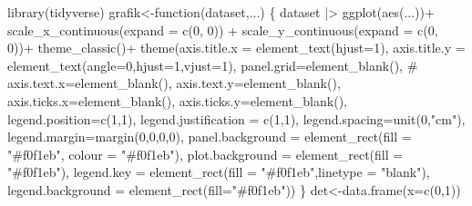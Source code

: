\documentclass[
  letterpaper,
  DIV=11,
  numbers=noendperiod]{scrartcl}
\newenvironment{Shaded}{\begin{snugshade}}{\end{snugshade}}
\newcommand{\AttributeTok}[1]{\textcolor[rgb]{0.40,0.45,0.13}{#1}}
\newcommand{\CommentTok}[1]{\textcolor[rgb]{0.37,0.37,0.37}{#1}}
\newcommand{\ControlFlowTok}[1]{\textcolor[rgb]{0.00,0.23,0.31}{#1}}
\newcommand{\DecValTok}[1]{\textcolor[rgb]{0.68,0.00,0.00}{#1}}
\newcommand{\FunctionTok}[1]{\textcolor[rgb]{0.28,0.35,0.67}{#1}}
\newcommand{\NormalTok}[1]{\textcolor[rgb]{0.00,0.23,0.31}{#1}}
\newcommand{\OtherTok}[1]{\textcolor[rgb]{0.00,0.23,0.31}{#1}}
\newcommand{\SpecialCharTok}[1]{\textcolor[rgb]{0.37,0.37,0.37}{#1}}
\newcommand{\StringTok}[1]{\textcolor[rgb]{0.13,0.47,0.30}{#1}}
\begin{document}
\begin{Shaded}
\begin{Highlighting}[]
\FunctionTok{library}\NormalTok{(tidyverse)}
\NormalTok{grafik}\OtherTok{\textless{}{-}}\ControlFlowTok{function}\NormalTok{(dataset,...) \{}
\NormalTok{  dataset }\SpecialCharTok{|\textgreater{}}
    \FunctionTok{ggplot}\NormalTok{(}\FunctionTok{aes}\NormalTok{(...))}\SpecialCharTok{+}
    \FunctionTok{scale\_x\_continuous}\NormalTok{(}\AttributeTok{expand =} \FunctionTok{c}\NormalTok{(}\DecValTok{0}\NormalTok{, }\DecValTok{0}\NormalTok{)) }\SpecialCharTok{+} \FunctionTok{scale\_y\_continuous}\NormalTok{(}\AttributeTok{expand =} \FunctionTok{c}\NormalTok{(}\DecValTok{0}\NormalTok{, }\DecValTok{0}\NormalTok{))}\SpecialCharTok{+}
    \FunctionTok{theme\_classic}\NormalTok{()}\SpecialCharTok{+}
    \FunctionTok{theme}\NormalTok{(}\AttributeTok{axis.title.x =} \FunctionTok{element\_text}\NormalTok{(}\AttributeTok{hjust=}\DecValTok{1}\NormalTok{),}
        \AttributeTok{axis.title.y =} \FunctionTok{element\_text}\NormalTok{(}\AttributeTok{angle=}\DecValTok{0}\NormalTok{,}\AttributeTok{hjust=}\DecValTok{1}\NormalTok{,}\AttributeTok{vjust=}\DecValTok{1}\NormalTok{),}
        \AttributeTok{panel.grid=}\FunctionTok{element\_blank}\NormalTok{(),}
\CommentTok{\#        axis.text.x=element\_blank(),}
        \AttributeTok{axis.text.y=}\FunctionTok{element\_blank}\NormalTok{(),}
        \AttributeTok{axis.ticks.x=}\FunctionTok{element\_blank}\NormalTok{(),}
        \AttributeTok{axis.ticks.y=}\FunctionTok{element\_blank}\NormalTok{(),}
        \AttributeTok{legend.position=}\FunctionTok{c}\NormalTok{(}\DecValTok{1}\NormalTok{,}\DecValTok{1}\NormalTok{),}
        \AttributeTok{legend.justification =} \FunctionTok{c}\NormalTok{(}\DecValTok{1}\NormalTok{,}\DecValTok{1}\NormalTok{),}
        \AttributeTok{legend.spacing=}\FunctionTok{unit}\NormalTok{(}\DecValTok{0}\NormalTok{,}\StringTok{"cm"}\NormalTok{),}
        \AttributeTok{legend.margin=}\FunctionTok{margin}\NormalTok{(}\DecValTok{0}\NormalTok{,}\DecValTok{0}\NormalTok{,}\DecValTok{0}\NormalTok{,}\DecValTok{0}\NormalTok{),}
        \AttributeTok{panel.background =} \FunctionTok{element\_rect}\NormalTok{(}\AttributeTok{fill =} \StringTok{"\#f0f1eb"}\NormalTok{,}
                                        \AttributeTok{colour =} \StringTok{"\#f0f1eb"}\NormalTok{),}
        \AttributeTok{plot.background =} \FunctionTok{element\_rect}\NormalTok{(}\AttributeTok{fill =} \StringTok{"\#f0f1eb"}\NormalTok{),}
        \AttributeTok{legend.key =} \FunctionTok{element\_rect}\NormalTok{(}\AttributeTok{fill =} \StringTok{"\#f0f1eb"}\NormalTok{,}\AttributeTok{linetype =} \StringTok{"blank"}\NormalTok{),}
        \AttributeTok{legend.background =} \FunctionTok{element\_rect}\NormalTok{(}\AttributeTok{fill=}\StringTok{"\#f0f1eb"}\NormalTok{))}
\NormalTok{\}  }
\NormalTok{det}\OtherTok{\textless{}{-}}\FunctionTok{data.frame}\NormalTok{(}\AttributeTok{x=}\FunctionTok{c}\NormalTok{(}\DecValTok{0}\NormalTok{,}\DecValTok{1}\NormalTok{))}


\end{Highlighting}
\end{Shaded}
\end{document}
